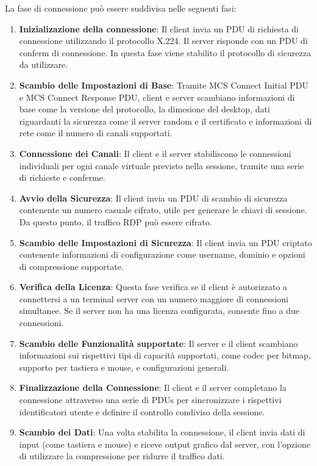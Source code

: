 \documentclass[12pt,a4paper,openright,twoside]{book}
\begin{document}
La fase di connessione può essere suddivisa nelle seguenti fasi:
\begin{enumerate}
    \item \textbf{Inizializazione della connessione}: Il client invia un \ac{PDU} di richiesta di connessione utilizzando il protocollo X.224. Il server risponde con un \ac{PDU} di conferm di connessione.
    In questa fase viene stabilito il protocollo di sicurezza da utilizzare.
    \item \textbf{Scambio delle Impostazioni di Base}: Tramite MCS Connect Initial \ac{PDU} e MCS Connect Response \ac{PDU},
    client e server scambiano informazioni di base come la versione del protocollo, la dimesione del desktop,
    dati riguardanti la sicurezza come il server random e il certificato e informazioni di rete come il numero di canali supportati.
    \item \textbf{Connessione dei Canali}: Il client e il server stabiliscono le connessioni individuali per ogni canale virtuale previsto nella sessione,
    tramite una serie di richieste e conferme.
    \item \textbf{Avvio della Sicurezza}: Il client invia un \ac{PDU} di scambio di sicurezza contenente un numero casuale cifrato, utile per generare le chiavi di sessione.
    Da questo punto, il traffico \ac{RDP} può essere cifrato.
    \item \textbf{Scambio delle Impostazioni di Sicurezza}: Il client invia un \ac{PDU} criptato contenente informazioni di configurazione come username,
    dominio e opzioni di compressione supportate.
    \item \textbf{Verifica della Licenza}: Questa fase verifica se il client è autorizzato a connettersi a un terminal server con un numero maggiore di connessioni simultanee.
    Se il server non ha una licenza configurata, consente fino a due connessioni.
    \item \textbf{Scambio delle Funzionalità supportate}: Il server e il client scambiano informazioni sui rispettivi tipi di capacità supportati, come codec per bitmap,
    supporto per tastiera e mouse, e configurazioni generali.
    \item \textbf{Finalizzazione della Connessione}: Il client e il server completano la connessione attraverso una serie di \ac{PDU}s per sincronizzare i rispettivi identificatori utente e definire il controllo condiviso della sessione.
    \item \textbf{Scambio dei Dati}: Una volta stabilita la connessione, il client invia dati di input (come tastiera e mouse) e riceve output grafico dal server,
    con l’opzione di utilizzare la compressione per ridurre il traffico dati.
\end{enumerate}
\end{document}
